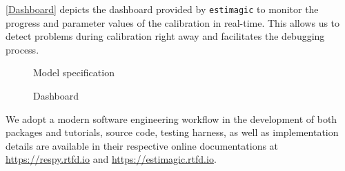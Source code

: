 \autoref{Dashboard} depicts the dashboard provided by \verb+estimagic+ to monitor the progress and parameter values of the calibration in real-time. This allows us to detect problems during calibration right away and facilitates the debugging process.

\begin{figure}[b!]\centering
	\hspace{0.3cm}
	\caption{Model specification}\label{Model specification}
\end{figure}%

\begin{figure}[b!]\centering
\caption{Dashboard}\label{Dashboard}
\end{figure}%

We adopt a modern software engineering workflow in the development of both packages and tutorials, source code, testing harness, as well as implementation details are available in their respective online documentations at \url{https://respy.rtfd.io} and \url{https://estimagic.rtfd.io}.
